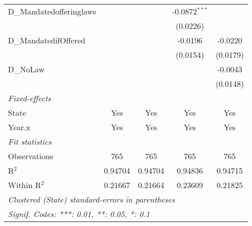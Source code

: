 \begin{table}[htbp]
\begin{tabular}{lcccc}
      D\_Mandatedofferinglaws        &                         &                         & -0.0872$^{***}$         &   \\   
                                     &                         &                         & (0.0226)                &   \\   
      D\_MandatedifOffered           &                         &                         & -0.0196                 & -0.0220\\   
                                     &                         &                         & (0.0154)                & (0.0179)\\   
      D\_NoLaw                       &                         &                         &                         & -0.0043\\   
                                     &                         &                         &                         & (0.0148)\\   
      \midrule
      \emph{Fixed-effects}\\
      State                          & Yes                     & Yes                     & Yes                     & Yes\\  
      Year.x                         & Yes                     & Yes                     & Yes                     & Yes\\  
      \midrule
      \emph{Fit statistics}\\
      Observations                   & 765                     & 765                     & 765                     & 765\\  
      R$^2$                          & 0.94704                 & 0.94704                 & 0.94836                 & 0.94715\\  
      Within R$^2$                   & 0.21667                 & 0.21664                 & 0.23609                 & 0.21825\\  
      \midrule \midrule
      \multicolumn{5}{l}{\emph{Clustered (State) standard-errors in parentheses}}\\
      \multicolumn{5}{l}{\emph{Signif. Codes: ***: 0.01, **: 0.05, *: 0.1}}\\
   \end{tabular}
\end{table}



